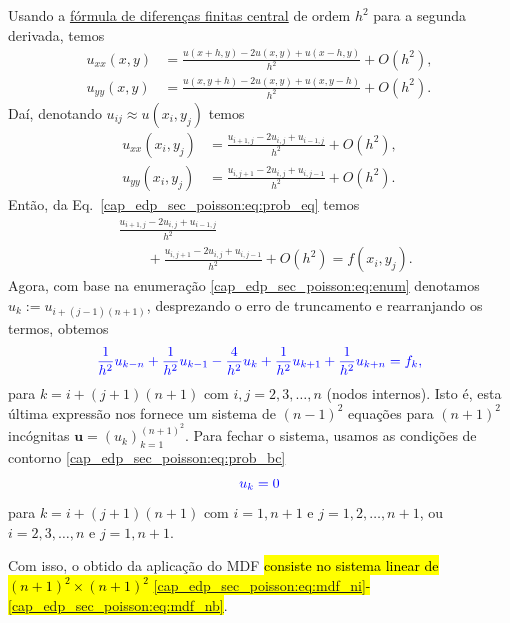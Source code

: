 Usando a \href{https://notaspedrok.com.br/notas/MatematicaNumericaII/cap_deriv_sec_d2f.html}{fórmula de diferenças finitas central} de ordem $h^2$ para a segunda derivada, temos
\begin{align}
  u_{xx}(x,y) &= \frac{u(x+h,y)-2u(x,y)+u(x-h,y)}{h^2} + O(h^2),\\
  u_{yy}(x,y) &= \frac{u(x,y+h)-2u(x,y)+u(x,y-h)}{h^2} + O(h^2).
\end{align}
Daí, denotando $u_{ij}\approx u(x_i, y_j)$ temos
\begin{align}
  u_{xx}(x_i,y_j) &= \frac{u_{i+1,j}-2u_{i,j}+u_{i-1,j}}{h^2} + O(h^2),\\
  u_{yy}(x_i,y_j) &= \frac{u_{i,j+1}-2u_{i,j}+u_{i,j-1}}{h^2} + O(h^2).  
\end{align}
Então, da Eq.~\ref{cap_edp_sec_poisson:eq:prob_eq} temos
\begin{equation}
  \begin{aligned}
    &\frac{u_{i+1,j}-2u_{i,j}+u_{i-1,j}}{h^2}\\
    &\qquad + \frac{u_{i,j+1}-2u_{i,j}+u_{i,j-1}}{h^2} + O(h^2) = f(x_i,y_j).
\end{aligned}
\end{equation}
Agora, com base na enumeração \eqref{cap_edp_sec_poisson:eq:enum} denotamos $u_k := u_{i+(j-1)(n+1)}$, desprezando o erro de truncamento e rearranjando os termos, obtemos
\begin{equation}\label{cap_edp_sec_poisson:eq:mdf_ni}\color{blue}\frac{1}{h^2}u_{k-n} + \frac{1}{h^2}u_{k-1} -\frac{4}{h^2}u_{k} + \frac{1}{h^2}u_{k+1} + \frac{1}{h^2}u_{k+n} = f_k,
\end{equation}
para $k = i + (j+1)(n+1)$ com $i,j=2, 3, \dotsc, n$ (nodos internos). Isto é, esta última expressão nos fornece um sistema de $(n-1)^2$ equações para $(n+1)^2$ incógnitas $\pmb{u} = (u_k)_{k=1}^{(n+1)^2}$. Para fechar o sistema, usamos as condições de contorno \eqref{cap_edp_sec_poisson:eq:prob_bc}
\begin{equation}\label{cap_edp_sec_poisson:eq:mdf_nb}\color{blue}u_k = 0
\end{equation}
para $k = i + (j+1)(n+1)$ com $i=1, n+1$ e $j=1, 2, \dotsc, n+1$, ou $i=2,3,\dotsc, n$ e $j=1, n+1$.

Com isso, o  obtido da aplicação do MDF \hl{consiste no sistema linear de $(n+1)^2\times (n+1)^2$ {\eqref{cap_edp_sec_poisson:eq:mdf_ni}}-{\eqref{cap_edp_sec_poisson:eq:mdf_nb}}}.


\begin{flushleft}
\end{flushleft}

